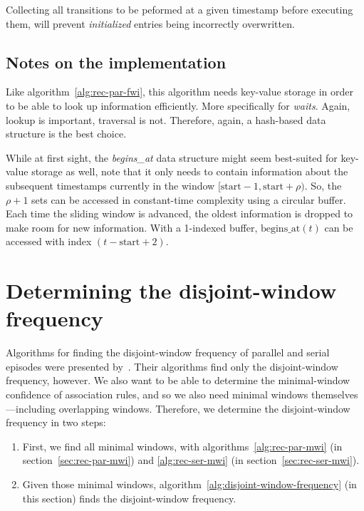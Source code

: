 Collecting all transitions to be peformed at a given timestamp before executing them, will prevent \emph{initialized} entries being incorrectly overwritten.

\subsection{Notes on the implementation}

Like algorithm~\ref{alg:rec-par-fwi}, this algorithm needs key-value storage in order to be able to look up information efficiently. More specifically for \emph{waits}. Again, lookup is important, traversal is not. Therefore, again, a hash-based data structure is the best choice.

While at first sight, the \emph{begins\_at} data structure might seem best-suited for key-value storage as well, note that it only needs to contain information about the subsequent timestamps currently in the window $ [\text{start} - 1, \text{start} + \rho) $. So, the $ \rho + 1 $ sets can be accessed in constant-time complexity using a circular buffer. Each time the sliding window is advanced, the oldest information is dropped to make room for new information. With a 1-indexed buffer, $ \text{begins\_at}(t) $ can be accessed with index $ (t - \text{start} + 2) $.



\section{Determining the disjoint-window frequency}
\label{sec:disjoint-window-frequency}

Algorithms for finding the disjoint-window frequency of parallel and serial episodes were presented by~\cite{laxman2007fast}. Their algorithms find only the disjoint-window frequency, however. We also want to be able to determine the minimal-window confidence of association rules, and so we also need minimal windows themselves---including overlapping windows. Therefore, we determine the disjoint-window frequency in two steps:
\begin{enumerate}
\item \label{enum-item:find-all-minimal-windows} First, we find all minimal windows, with algorithms~\ref{alg:rec-par-mwi} (in section~\ref{sec:rec-par-mwi}) and \ref{alg:rec-ser-mwi} (in section~\ref{sec:rec-ser-mwi}).
\item \label{enum-item:find-disjoint-window-frequency} Given those minimal windows, algorithm~\ref{alg:disjoint-window-frequency} (in this section) finds the disjoint-window frequency.
\end{enumerate}

